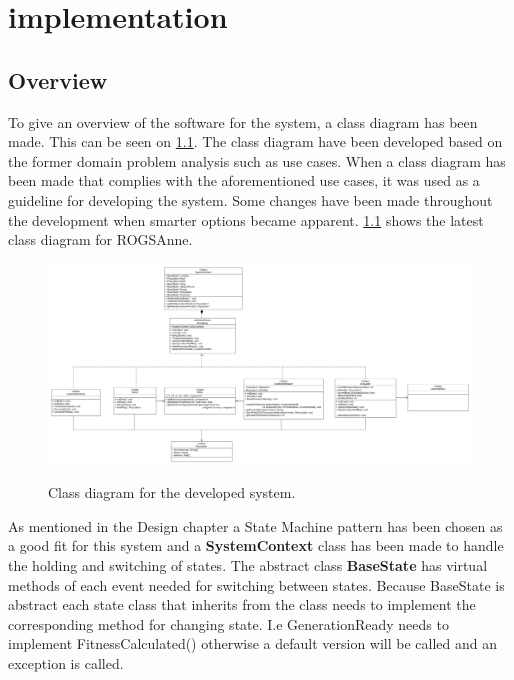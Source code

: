 
\chapter{implementation}

\section{Overview}
To give an overview of the software for the system, a class diagram has been made. This can be seen on \cref{fig:ClassDiagram}.
The class diagram have been developed based on the former domain problem analysis such as use cases. When a class diagram has been made that complies with the aforementioned use cases, it was used as a guideline for developing the system. Some changes have been made throughout the development when smarter options became apparent. \cref{fig:ClassDiagram} shows the latest class diagram for ROGSAnne.

\begin{figure}[H]
	\centering
	{\includegraphics[width=\textwidth]{Images/ClassDiagram.PNG}}\\[0.5cm]
	\caption{Class diagram for the developed system.}
	\label{fig:ClassDiagram}
\end{figure}

As mentioned in the Design chapter a State Machine pattern has been chosen as a good fit for this system and a \textbf{SystemContext} class has been made to handle the holding and switching of states. The abstract class \textbf{BaseState} has virtual methods of each event needed for switching between states. Because BaseState is abstract each state class that inherits from the class needs to implement the corresponding method for changing state. I.e GenerationReady needs to implement FitnessCalculated() otherwise a default version will be called and an exception is called.

